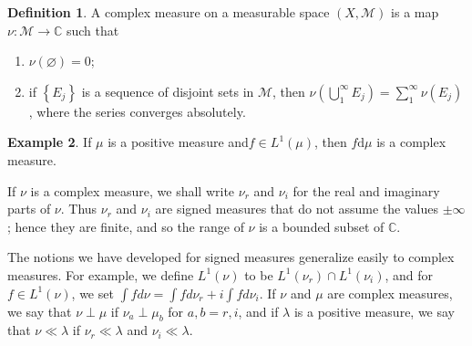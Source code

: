 \documentclass[12pt,a4paper]{book}
\newenvironment{enu}{\begin{enumerate}[(1)]}{\end{enumerate}}
\theoremstyle{definition}
\newtheorem{defn}{Definition}[section]
\newtheorem{exam}[defn]{Example}
\begin{document}
\begin{defn}
    A complex measure on a measurable space $(X, \mathcal{M})$ is a map $\nu: \mathcal{M} \rightarrow \mathbb{C}$ such that
    \begin{enu}
        \item $\nu(\varnothing)=0$;
        \item if $\left\{E_j\right\}$ is a sequence of disjoint sets in $\mathcal{M}$, then $\nu\left(\bigcup_1^{\infty} E_j\right)=\sum_1^{\infty} \nu\left(E_j\right)$, where the series converges absolutely.
    \end{enu}
\end{defn}
\begin{exam}
    If $\mu$ is a positive measure and$ f\in L^1(\mu)$, then
    $f\text{d}\mu$ is a complex measure.
\end{exam}

If $\nu$ is a complex measure,
we shall write $\nu_r$ and $\nu_i$ for the real and imaginary parts of $\nu$. Thus $\nu_r$ and $\nu_i$ are signed measures that do not assume the values $\pm \infty$; hence they are finite, and so the range of $\nu$ is a bounded subset of $\mathbb{C}$.

The notions we have developed for signed measures generalize easily to complex measures. For example, we define $L^1(\nu)$ to be $L^1\left(\nu_r\right) \cap L^1\left(\nu_i\right)$,
and for $f \in L^1(\nu)$, we set $\int f d \nu=\int f d \nu_r+i \int f d \nu_i$.
If $\nu$ and $\mu$ are complex measures, we say
that $\nu \perp \mu$ if $\nu_a \perp \mu_b$ for $a, b=r, i$, and if $\lambda$ is a positive measure,
we say that $\nu \ll \lambda$ if $\nu_r \ll \lambda$ and $\nu_i \ll \lambda$.
\end{document}
